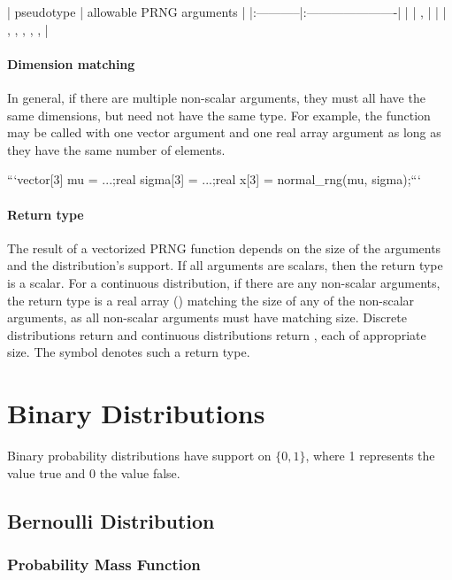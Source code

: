 \begin{description}
{\begin{description}
| pseudotype | allowable PRNG arguments |
|:-----------|:----------------------|
| | ,    |
| | ,  ,  ,  ,  ,   |


\subsubsection{Dimension matching}


In general, if there are multiple non-scalar arguments, they must all have the same dimensions, but need not have the same type.  For example, the  function may be called with one vector argument and one real array argument as long as they have the same number of elements.


```\n vector[3] mu = ...;\n real sigma[3] = ...;\n real x[3] = normal_rng(mu, sigma);\n ```


\subsubsection{Return type}


The result of a vectorized PRNG function depends on the size of the arguments and the distribution's support.  If all arguments are scalars, then the return type is a scalar.  For a continuous distribution, if there are any non-scalar arguments, the return type is a real array () matching the size of any of the non-scalar arguments, as all non-scalar arguments must have matching size.  Discrete distributions return  and continuous distributions return , each of appropriate size.  The symbol  denotes such a return type.


\chapter{Binary Distributions}


Binary probability distributions have support on $\{0,1\}$, where 1 represents the value true and 0 the value false.


\section{Bernoulli Distribution}


\subsection{Probability Mass Function}



\end{description}}
\end{description}
